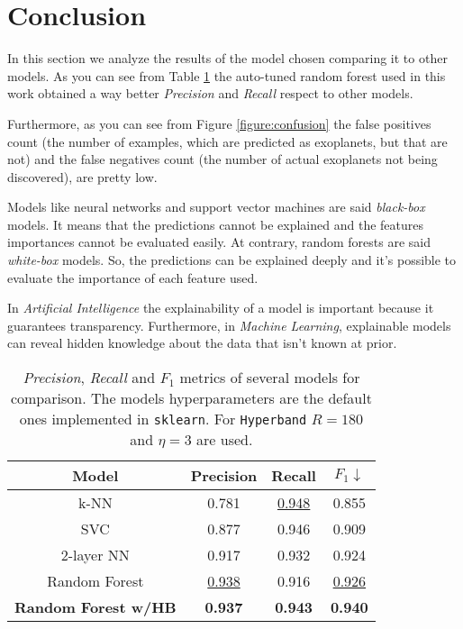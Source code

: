 \documentclass[11pt, a4paper]{article}
\begin{document}
\section{Conclusion}
  In this section we analyze the results of the model chosen comparing it to other models.
  As you can see from Table \ref{table:benchmark} the auto-tuned random forest used in this work obtained a way better \textit{Precision} and \textit{Recall} respect to other models.

  Furthermore, as you can see from Figure \ref{figure:confusion} the false positives count (the number of examples, which are predicted as exoplanets, but that are not) and the false negatives count (the number of actual exoplanets not being discovered), are pretty low.

  Models like neural networks and support vector machines are said \textit{black-box} models.
  It means that the predictions cannot be explained and the features importances cannot be evaluated easily.
  At contrary, random forests are said \textit{white-box} models.
  So, the predictions can be explained deeply and it's possible to evaluate the importance of each feature used.

  In \textit{Artificial Intelligence} the explainability of a model is important because it guarantees transparency.
  Furthermore, in \textit{Machine Learning}, explainable models can reveal hidden knowledge about the data that isn't known at prior.

  \begin{table}
    \centering
    \begin{tabular}{|c c c c|}
      \hline
      Model & Precision & Recall & $F_{1} \downarrow$  \\
      \hline\hline
      k-NN & 0.781 & \underline{0.948} & 0.855 \\
      \hline
      SVC & 0.877 & 0.946 & 0.909 \\
      \hline
      2-layer NN & 0.917 & 0.932 & 0.924 \\
      \hline
      Random Forest & \underline{0.938} & 0.916 & \underline{0.926} \\
      \hline
      \textbf{Random Forest w/HB} & \textbf{0.937} & \textbf{0.943} & \textbf{0.940} \\
      \hline
    \end{tabular}
    \caption{\textit{Precision}, \textit{Recall} and $F_{1}$ metrics of several models for comparison. The models hyperparameters are the default ones implemented in \texttt{sklearn}. For \texttt{Hyperband} $R=180$ and $\eta=3$ are used.}
    \label{table:benchmark}
  \end{table}
\end{document}
